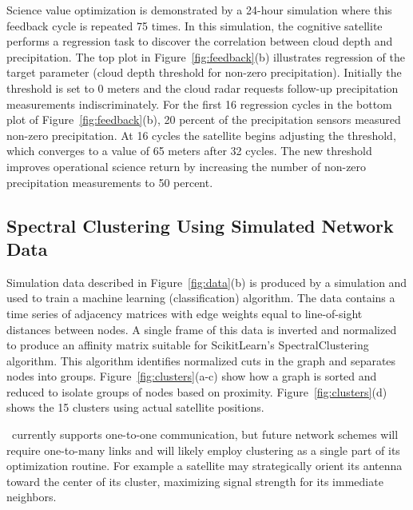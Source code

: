 \documentclass[conference]{IEEEtran}
\newcommand{\project}{{\sc{Collaborate}}~}
\begin{document}
Science value optimization is demonstrated by a 24-hour simulation where this feedback cycle is repeated 75 times.  In this simulation, the cognitive satellite performs a regression task to discover the correlation between cloud depth and precipitation.  The top plot in Figure~\ref{fig:feedback}(b) illustrates regression of the target parameter (cloud depth threshold for non-zero precipitation).  Initially the threshold is set to 0 meters and the cloud radar requests follow-up precipitation measurements indiscriminately.  For the first 16 regression cycles in the bottom plot of Figure~\ref{fig:feedback}(b), 20 percent of the precipitation sensors measured non-zero precipitation.  At 16 cycles the satellite begins adjusting the threshold, which converges to a value of 65 meters after 32 cycles.  The new threshold improves operational science return by increasing the number of non-zero precipitation measurements to 50 percent.

\subsection{Spectral Clustering Using Simulated Network Data}
\label{ssec:cluster}

Simulation data described in Figure~\ref{fig:data}(b) is produced by a simulation and used to train a machine learning (classification) algorithm.  The data contains a time series of adjacency matrices with edge weights equal to line-of-sight distances between nodes.  A single frame of this data is inverted and normalized to produce an affinity matrix suitable for ScikitLearn's SpectralClustering algorithm.  This algorithm identifies normalized cuts in the graph and separates nodes into groups.  Figure~\ref{fig:clusters}(a-c) show how a graph is sorted and reduced to isolate groups of nodes based on proximity.  Figure~\ref{fig:clusters}(d) shows the 15 clusters using actual satellite positions.

\project currently supports one-to-one communication, but future network schemes will require one-to-many links and will likely employ clustering as a single part of its optimization routine.  For example a satellite may strategically orient its antenna toward the center of its cluster, maximizing signal strength for its immediate neighbors.
\end{document}
